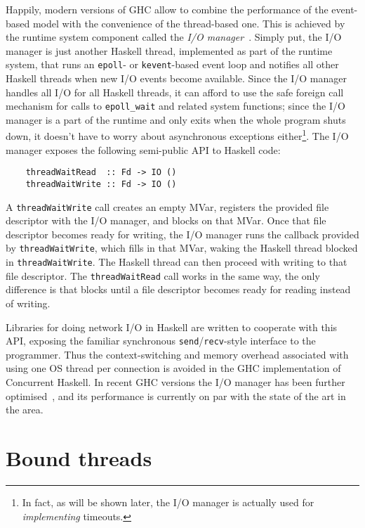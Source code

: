 \documentclass[a4paper,11pt,oneside]{report}
\begin{document}
Happily, modern versions of GHC allow to combine the performance of the
event-based model with the convenience of the thread-based one. This is achieved
by the runtime system component called the \textit{I/O
  manager}~\cite{bib:o'sullivan}. Simply put, the I/O manager is just another
Haskell thread, implemented as part of the runtime system, that runs an
\texttt{epoll}- or \texttt{kevent}-based event loop and notifies all other
Haskell threads when new I/O events become available. Since the I/O manager
handles all I/O for all Haskell threads, it can afford to use the safe foreign
call mechanism for calls to \texttt{epoll\_wait} and related system functions;
since the I/O manager is a part of the runtime and only exits when the whole
program shuts down, it doesn't have to worry about asynchronous exceptions
either\footnote{In fact, as will be shown later, the I/O manager is actually
  used for \textit{implementing} timeouts.}. The I/O manager exposes the
following semi-public API to Haskell code:

\begin{verbatim}
    threadWaitRead  :: Fd -> IO ()
    threadWaitWrite :: Fd -> IO ()
\end{verbatim}

A \texttt{threadWaitWrite} call creates an empty MVar, registers the provided
file descriptor with the I/O manager, and blocks on that MVar. Once that file
descriptor becomes ready for writing, the I/O manager runs the callback provided
by \texttt{threadWaitWrite}, which fills in that MVar, waking the Haskell thread
blocked in \texttt{threadWaitWrite}. The Haskell thread can then proceed with
writing to that file descriptor. The \texttt{threadWaitRead} call works in the
same way, the only difference is that blocks until a file descriptor becomes
ready for reading instead of writing.

Libraries for doing network I/O in Haskell are written to cooperate with this
API, exposing the familiar synchronous \texttt{send}/\texttt{recv}-style
interface to the programmer. Thus the context-switching and memory overhead
associated with using one OS thread per connection is avoided in the GHC
implementation of Concurrent Haskell. In recent GHC versions the I/O manager has
been further optimised~\cite{bib:voellmy}, and its performance is currently on
par with the state of the art in the area.

\section{Bound threads}
\label{sec:bound-threads}
\end{document}

